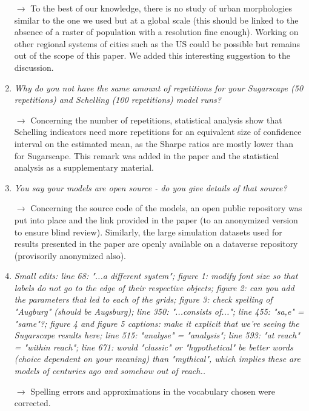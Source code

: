 \documentclass[11pt,a4paper,sans]{moderncv}        %
\begin{document}
\begin{enumerate}
	\medskip
	
	$\rightarrow$ To the best of our knowledge, there is no study of urban morphologies similar to the one we used but at a global scale (this should be linked to the absence of a raster of population with a resolution fine enough). Working on other regional systems of cities such as the US could be possible but remains out of the scope of this paper. We added this interesting suggestion to the discussion.
	\bigskip
	
	\item \textit{Why do you not have the same amount of repetitions for your Sugarscape (50 repetitions) and Schelling (100 repetitions) model runs?}
	
	\medskip
	
	$\rightarrow$ Concerning the number of repetitions, statistical analysis show that Schelling indicators need more repetitions for an equivalent size of confidence interval on the estimated mean, as the Sharpe ratios are mostly lower than for Sugarscape. This remark was added in the paper and the statistical analysis as a supplementary material.
	\bigskip
	
	\item \textit{You say your models are open source - do you give details of that source?}
	
	\medskip
	
	$\rightarrow$ Concerning the source code of the models, an open public repository was put into place and the link provided in the paper (to an anonymized version to ensure blind review). Similarly, the large simulation datasets used for results presented in the paper are openly available on a dataverse repository (provisorily anonymized also).
	\bigskip
	
	\item \textit{Small edits: line 68: "...a different system"; figure 1: modify font size so that labels do not go to the edge of their respective objects; figure 2: can you add the parameters that led to each of the grids; figure 3: check spelling of "Augburg" (should be Augsburg); line 350: "...consists of..."; line 455: "sa,e" = "same"?; figure 4 and figure 5 captions: make it explicit that we're seeing the Sugarscape results here; line 515: "analyse" = "analysis"; line 593: "at reach" = "within reach"; line 671: would "classic" or "hypothetical" be better words (choice dependent on your meaning) than "mythical", which implies these are models of centuries ago and somehow out of reach..}
	
	\medskip
	
	$\rightarrow$ Spelling errors and approximations in the vocabulary chosen were corrected.
\end{enumerate}
\end{document}
